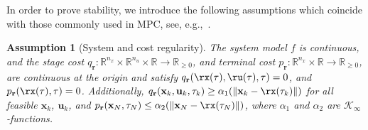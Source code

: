 \documentclass[journal]{IEEEtran}
\newcommand{\x}{{\mathbf{x}}}
\renewcommand{\u}{{\mathbf{u}}}
\renewcommand{\r}{{\mathbf{r}}}
\newcommand{\bx}{{\x}}
\newcommand{\bu}{{\u}}
\newcommand{\btau}{{\tau}}
\newcommand{\review}[1]{#1}
\newtheorem{Assumption}{Assumption}
\begin{document}
	
	
	
	

	In order to prove stability, we introduce the following assumptions \review{which coincide with those commonly used in MPC}, see, e.g.,~\cite{rawlings2009model,Grune2011}.
	\begin{Assumption}[System and cost regularity]\label{a:cont}
			The system model $f$ is continuous, and the stage cost \review{$q_\r:\mathbb{R}^{n_x}\times \mathbb{R}^{n_u} \times \mathbb{R}\rightarrow\mathbb{R}_{\geq{}0}$, and terminal cost $p_\r:\mathbb{R}^{n_x}\times \mathbb{R}\rightarrow\mathbb{R}_{\geq{}0}$}, are continuous at the origin and satisfy $q_\r(\rx(\tau),\ru(\tau),\tau)=0$, and $p_\r(\rx(\tau),\tau)=0$. Additionally, $q_\r(\bx_k,\bu_k,\btau_k)\geq{}\alpha_1(\|\bx_k-\rx(\btau_k)\|)$ for all feasible $\x_k$, $\u_k$, and  $p_\r(\bx_N,\btau_N)\leq\alpha_2(\|\bx_N-\rx(\btau_N)\|)$, where $\alpha_1$ and $\alpha_2$ are $\mathcal{K}_\infty$-functions.
	\end{Assumption}
	
\end{document}
